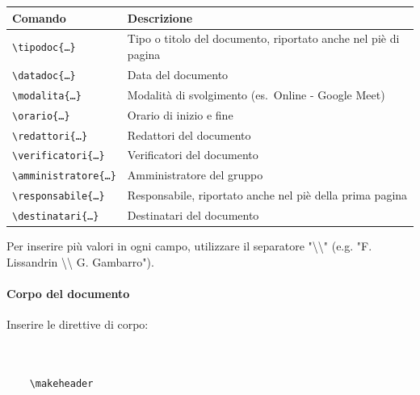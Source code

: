 \begin{center}
    \renewcommand{\arraystretch}{1.3}
    \begin{tabularx}{\textwidth}{@{} l X @{}}
        \toprule
        \textbf{Comando}                                & \textbf{Descrizione}                                           \\
        \midrule
        \texttt{\textbackslash tipodoc\{\dots\}}        & Tipo o titolo del documento, riportato anche nel piè di pagina \\
        \texttt{\textbackslash datadoc\{\dots\}}        & Data del documento                                             \\
        \texttt{\textbackslash modalita\{\dots\}}       & Modalità di svolgimento (es.\ Online - Google Meet)            \\
        \texttt{\textbackslash orario\{\dots\}}         & Orario di inizio e fine                                        \\
        \texttt{\textbackslash redattori\{\dots\}}      & Redattori del documento                                        \\
        \texttt{\textbackslash verificatori\{\dots\}}   & Verificatori del documento                                     \\
        \texttt{\textbackslash amministratore\{\dots\}} & Amministratore del gruppo                                      \\
        \texttt{\textbackslash responsabile\{\dots\}}   & Responsabile, riportato anche nel piè della prima pagina       \\
        \texttt{\textbackslash destinatari\{\dots\}}    & Destinatari del documento                                      \\
        \bottomrule
    \end{tabularx}
\end{center}

Per inserire più valori in ogni campo, utilizzare il separatore "\textbackslash \textbackslash" (e.g. "F. Lissandrin \textbackslash \textbackslash{ } G. Gambarro").

\paragraph{Corpo del documento}
Inserire le direttive di corpo:

\begin{verbatim}
    

    \makeheader


    
\end{verbatim}

